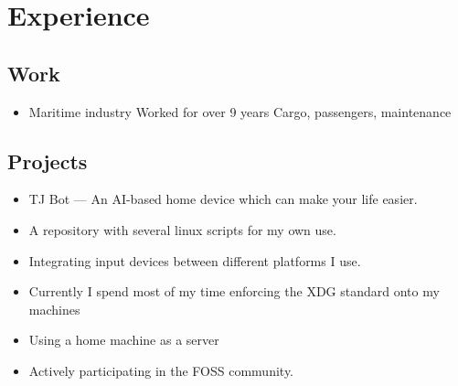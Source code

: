 \documentclass{curriculum}
\begin{document}
	\section{Experience}	
	\begin{half}
	\subsection{Work}
		\begin{itemize}
		\item Maritime industry
			\subitem Worked for over 9 years
			\subitem Cargo, passengers, maintenance
		\end{itemize}
	\end{half}
	\begin{half}
	\subsection{Projects}
		\begin{itemize}
			\item TJ Bot --- An AI-based home device which can make your life easier.
			\item A repository with several linux scripts for my own use.
			\item Integrating input devices between different platforms I use.
			\item Currently I spend most of my time enforcing the XDG standard onto my machines
			\item Using a home machine as a server
			\item Actively participating in the FOSS community.
		\end{itemize}
	\end{half}
\end{document}
